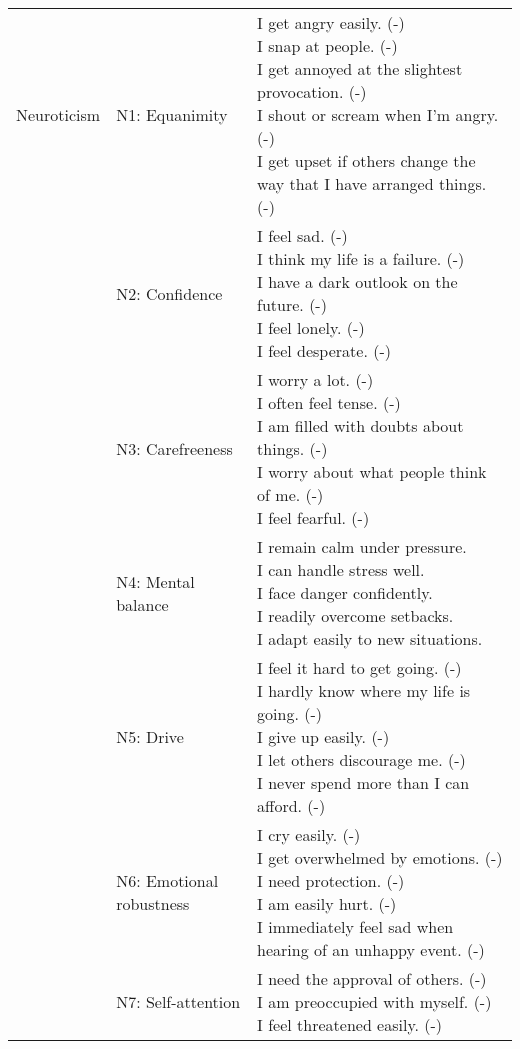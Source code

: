 \documentclass[,man,floatsintext]{apa6}
\theoremstyle{definition}
\theoremstyle{definition}
\theoremstyle{definition}
\theoremstyle{remark}
\begin{document}
\begin{longtable}[t]{lll}
\addlinespace
Neuroticism & N1: Equanimity & \makecell[l]{I get angry easily. (-)\\I snap at people. (-)\\I get annoyed at the slightest provocation. (-)\\I shout or scream when I'm angry. (-)\\I get upset if others change the way that I have arranged things. (-)}\\
\addlinespace
 & N2: Confidence & \makecell[l]{I feel sad. (-)\\I think my life is a failure. (-)\\I have a dark outlook on the future. (-)\\I feel lonely. (-)\\I feel desperate. (-)}\\
\addlinespace
 & N3: Carefreeness & \makecell[l]{I worry a lot. (-)\\I often feel tense. (-)\\I am filled with doubts about things. (-)\\I worry about what people think of me. (-)\\I feel fearful. (-)}\\
\addlinespace
 & N4: Mental balance & \makecell[l]{I remain calm under pressure.\\I can handle stress well.\\I face danger confidently.\\I readily overcome setbacks.\\I adapt easily to new situations.}\\
\addlinespace
 & N5: Drive & \makecell[l]{I feel it hard to get going. (-)\\I hardly know where my life is going. (-)\\I give up easily. (-)\\I let others discourage me. (-)\\I never spend more than I can afford. (-)}\\
\addlinespace
 & N6: Emotional robustness & \makecell[l]{I cry easily. (-)\\I get overwhelmed by emotions. (-)\\I need protection. (-)\\I am easily hurt. (-)\\I immediately feel sad when hearing of an unhappy event. (-)}\\
\addlinespace
 & N7: Self-attention & \makecell[l]{I need the approval of others. (-)\\I am preoccupied with myself. (-)\\I feel threatened easily. (-)}\\

\end{longtable}
\end{document}
